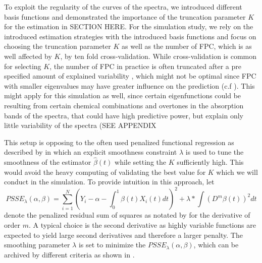 \documentclass[11pt,twoside,a4paper]{article}
\begin{document}
	
	 To exploit the regularity of the curves of the spectra, we introduced different basis functions and demonstrated the importance of the truncation parameter $K$ for the estimation in SECTION HERE. For the simulation study, we rely on the introduced estimation strategies with the introduced basis functions and focus on choosing the truncation parameter $K$ as well as the number of FPC, which is as well affected by $K$, by ten fold cross-validation. While cross-validation is common for selecting $K$, the number of FPC in practice is often truncated after a pre specified amount of explained variability \cite{kokoszka_introduction_2017}, which might not be optimal since FPC with smaller eigenvalues may have greater influence on the prediction (c.f \cite{Jolliffe_1982}). This might apply for this simulation as well, since certain eigenfunctions could be resulting from certain chemical combinations and overtones in the absorption bands of the spectra, that could have high predictive power, but explain only little variability of the spectra (SEE APPENDIX
	 
	 This setup is opposing to the often used penalized functional regression as described by \cite{Goldsmith_2011} in which an explicit smoothness constraint $\lambda$ is used to tune the smoothness of the estimator $\hat{\beta}(t)$ while setting the $K$ sufficiently high. This would avoid the heavy computing of validating the best value for $K$ which we will conduct in the simulation. To provide intuition in this approach, let 
	 \begin{equation}
	 	PSSE_\lambda(\alpha, \beta) = \sum_{i = 1}^{N} (Y_i -\alpha -\int_0^1 \beta(t)X_i(t)dt)^2 + \lambda * \int (D^m\beta(t))^2 dt
	 \end{equation}
	 denote the penalized residual sum of squares as notated by \cite{ramsay_functional_2005} for the derivative of order $m$. A typical choice is the second derivative as highly variable functions are expected to yield large second derivatives and therefore a larger penalty. The smoothing parameter $\lambda$ is set to minimize the $PSSE_\lambda(\alpha, \beta)$, which can be archived by different criteria as shown in \cite{ThomasLee_2003}.
	 
	 
	 
	 
		
	
\end{document}
